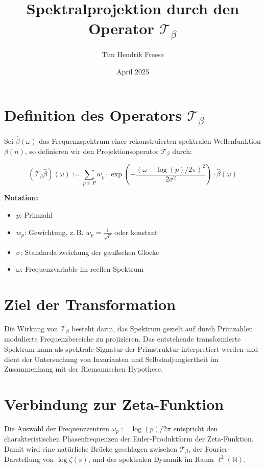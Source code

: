 \documentclass[12pt]{article}
\title{Spektralprojektion durch den Operator \(\mathcal{T}_\beta\)}
\author{Tim Hendrik Freese}
\date{April 2025}
\begin{document}
\maketitle

\section*{Definition des Operators \(\mathcal{T}_\beta\)}

Sei \(\hat{\beta}(\omega)\) das Frequenzspektrum einer rekonstruierten spektralen Wellenfunktion \(\beta(n)\), so definieren wir den Projektionsoperator \(\mathcal{T}_\beta\) durch:

\begin{equation}
(\mathcal{T}_\beta \hat{\beta})(\omega) := \sum_{p \leq P} w_p \cdot \exp\left( -\frac{(\omega - \log(p)/2\pi)^2}{2\sigma^2} \right) \cdot \hat{\beta}(\omega)
\end{equation}

\textbf{Notation:}
\begin{itemize}
    \item \(p\): Primzahl
    \item \(w_p\): Gewichtung, z.\,B. \(w_p = \frac{1}{\sqrt{p}}\) oder konstant
    \item \(\sigma\): Standardabweichung der gaußschen Glocke
    \item \(\omega\): Frequenzvariable im reellen Spektrum
\end{itemize}

\section*{Ziel der Transformation}

Die Wirkung von \(\mathcal{T}_\beta\) besteht darin, das Spektrum gezielt auf durch Primzahlen modulierte Frequenzbereiche zu projizieren. Das entstehende transformierte Spektrum kann als spektrale Signatur der Primstruktur interpretiert werden und dient der Untersuchung von Invarianten und Selbstadjungiertheit im Zusammenhang mit der Riemannschen Hypothese.

\section*{Verbindung zur Zeta-Funktion}

Die Auswahl der Frequenzzentren \(\omega_p := \log(p)/2\pi\) entspricht den charakteristischen Phasenfrequenzen der Euler-Produktform der Zeta-Funktion. Damit wird eine natürliche Brücke geschlagen zwischen \(\mathcal{T}_\beta\), der Fourier-Darstellung von \(\log \zeta(s)\), und der spektralen Dynamik im Raum \(\ell^2(\mathbb{N})\).
\end{document}
